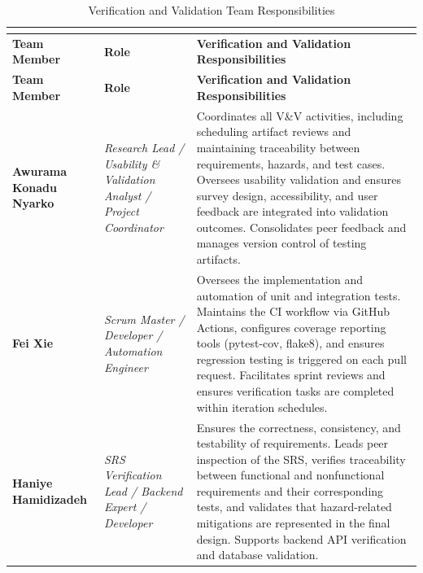 \documentclass[12pt, titlepage]{article}
\begin{document}
\begin{center}
\footnotesize
{}
\begin{longtable}{|>{\raggedright\arraybackslash}p{}|
                    >{\raggedright\arraybackslash}p{}|
                    >{\raggedright\arraybackslash}p{}|}
\caption{Verification and Validation Team Responsibilities} \\
\label{tab:vvteamresponsibilities} \\
\hline
\rowcolor{gray!15}
\textbf{Team Member} & \textbf{Role} & \textbf{Verification and Validation Responsibilities} \\
\hline
\endfirsthead

\hline
\rowcolor{gray!15}
\textbf{Team Member} & \textbf{Role} & \textbf{Verification and Validation Responsibilities} \\
\hline
\endhead

\hline
\endfoot
\hline
\endlastfoot

\textbf{Awurama Konadu Nyarko} &
\textit{Research Lead / Usability \& Validation Analyst / Project Coordinator} &
Coordinates all V\&V activities, including scheduling artifact reviews and maintaining traceability between requirements, hazards, and test cases. Oversees usability validation and ensures survey design, accessibility, and user feedback are integrated into validation outcomes. Consolidates peer feedback and manages version control of testing artifacts. \\
\hline

\textbf{Fei Xie} &
\textit{Scrum Master / Developer / Automation Engineer} &
Oversees the implementation and automation of unit and integration tests. Maintains the CI workflow via GitHub Actions, configures coverage reporting tools (pytest-cov, flake8), and ensures regression testing is triggered on each pull request. Facilitates sprint reviews and ensures verification tasks are completed within iteration schedules. \\
\hline

\textbf{Haniye Hamidizadeh} &
\textit{SRS Verification Lead / Backend Expert / Developer} &
Ensures the correctness, consistency, and testability of requirements. Leads peer inspection of the SRS, verifies traceability between functional and nonfunctional requirements and their corresponding tests, and validates that hazard-related mitigations are represented in the final design. Supports backend API verification and database validation. \\
\hline


\end{longtable}
\end{center}
\end{document}
